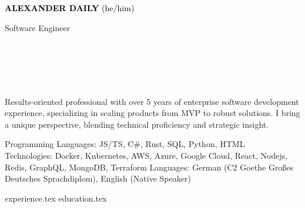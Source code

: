 \documentclass[11pt]{developercv} %
\begin{document}

\begin{minipage}[t]{0.4\textwidth} 
	\vspace{-\baselineskip} %
	
  { \fontsize{16}{20} \textcolor{black}{\textbf{\MakeUppercase{Alexander Daily}} (he/him)}} %
	
	\vspace{6pt}
	
	{\Large Software Engineer} %
\end{minipage}
\hfill
\begin{minipage}[t]{0.35\textwidth} %
	\vspace{-\baselineskip} %
	
  	\\	
    \\
    \\
    \\    
    
\end{minipage}

  Results-oriented professional with over 5 years of enterprise software development experience, specializing in scaling products from MVP to robust solutions. I bring a unique perspective, blending technical proficiency and strategic insight.
	\vspace{-8pt}

    \vspace{-6pt}

\begin{entrylist}
      \entry 
      {Programming Languages:}
      {JS/TS, C\#, Rust, SQL, Python, HTML}
      {}
      {}\\
      \entry 
      {Technologies:}
      {Docker, Kubernetes, AWS, Azure, Google Cloud, React, Nodejs, Redis, GraphQL, MongoDB, Terraform}
      {}
      {}
      \entry 
      {Languages:}
      {German (C2 Goethe Großes Deutsches Sprachdiplom), English (Native Speaker)}
      {}
      {}
\end{entrylist}
    
{experience.tex}
{education.tex}
\end{document}
